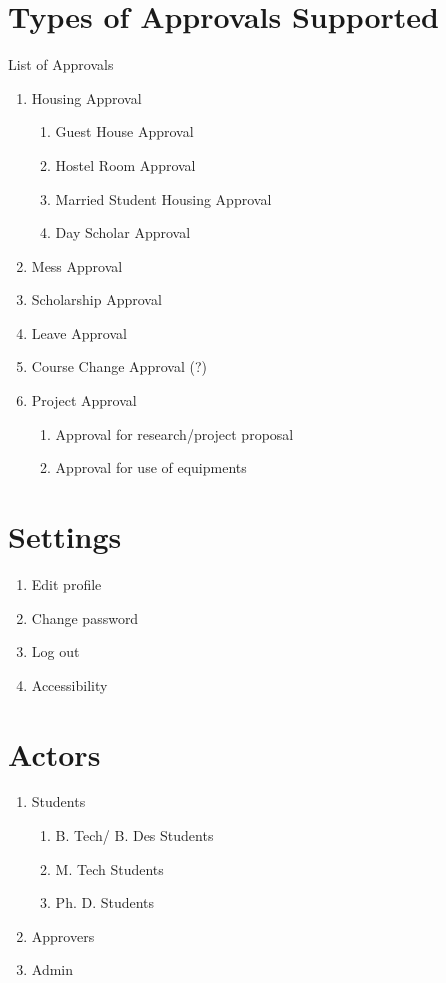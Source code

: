 \documentclass{beamer}
\begin{document}
\section{Types of Approvals Supported}
\begin{frame}{List of Approvals}
\begin{enumerate}
\item Housing Approval
\begin{enumerate}
\item Guest House Approval
\item Hostel Room Approval
\item Married Student Housing Approval
\item Day Scholar Approval
\end{enumerate}
\item Mess Approval
\item Scholarship Approval
\item Leave Approval
\item Course Change Approval (?)
\item Project Approval
\begin{enumerate}
\item Approval for research/project proposal
\item Approval for use of equipments
\end{enumerate}
\end{enumerate}
\end{frame}

\section{Settings}
\begin{frame}
\begin{enumerate}
\item Edit profile
\item Change password
\item Log out
\item Accessibility
\end{enumerate}
\end{frame}

\section{Actors}
\begin{frame}
\begin{enumerate}
\item Students
\begin{enumerate}
\item B. Tech/ B. Des Students
\item M. Tech Students
\item Ph. D. Students
\end{enumerate}
\item Approvers
\item Admin
\end{enumerate}
\end{frame}
\end{document}
